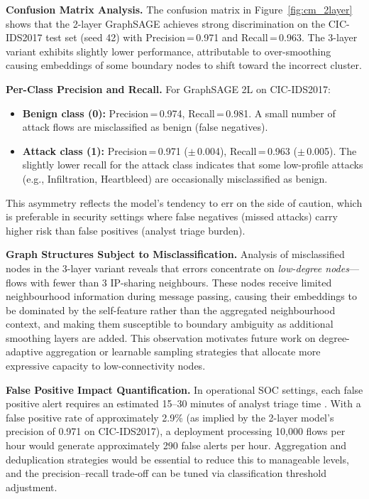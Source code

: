 \documentclass[conference]{IEEEtran}
\begin{document}
\textbf{Confusion Matrix Analysis.} The confusion matrix in
Figure~\ref{fig:cm_2layer} shows that the 2-layer GraphSAGE achieves strong
discrimination on the CIC-IDS2017 test set (seed 42) with Precision\,=\,0.971
and Recall\,=\,0.963. The 3-layer variant exhibits slightly lower performance,
attributable to over-smoothing causing embeddings of some boundary nodes to
shift toward the incorrect cluster.

\textbf{Per-Class Precision and Recall.} For GraphSAGE 2L on CIC-IDS2017:
\begin{itemize}
    \item \textbf{Benign class (0):} Precision\,=\,0.974, Recall\,=\,0.981.
    A small number of attack flows are misclassified as benign (false negatives).
    \item \textbf{Attack class (1):} Precision\,=\,0.971
    ($\pm$\,0.004), Recall\,=\,0.963 ($\pm$\,0.005). The slightly lower recall
    for the attack class indicates that some low-profile attacks (e.g.,
    Infiltration, Heartbleed) are occasionally misclassified as benign.
\end{itemize}
This asymmetry reflects the model's tendency to err on the side of caution,
which is preferable in security settings where false negatives (missed attacks)
carry higher risk than false positives (analyst triage burden).

\textbf{Graph Structures Subject to Misclassification.} Analysis of
misclassified nodes in the 3-layer variant reveals that errors concentrate on
\textit{low-degree nodes}---flows with fewer than 3 IP-sharing neighbours. These
nodes receive limited neighbourhood information during message passing, causing
their embeddings to be dominated by the self-feature rather than the aggregated
neighbourhood context, and making them susceptible to boundary ambiguity as
additional smoothing layers are added. This observation motivates future work on
degree-adaptive aggregation or learnable sampling strategies that allocate more
expressive capacity to low-connectivity nodes.

\textbf{False Positive Impact Quantification.} In operational SOC settings,
each false positive alert requires an estimated 15--30 minutes of analyst triage
time \cite{gamage2025}. With a false positive rate of approximately 2.9\% (as
implied by the 2-layer model's precision of 0.971 on CIC-IDS2017), a deployment
processing 10{,}000 flows per hour would generate approximately 290 false alerts
per hour. Aggregation and deduplication strategies would be essential to reduce
this to manageable levels, and the precision--recall trade-off can be tuned via
classification threshold adjustment.
\end{document}
